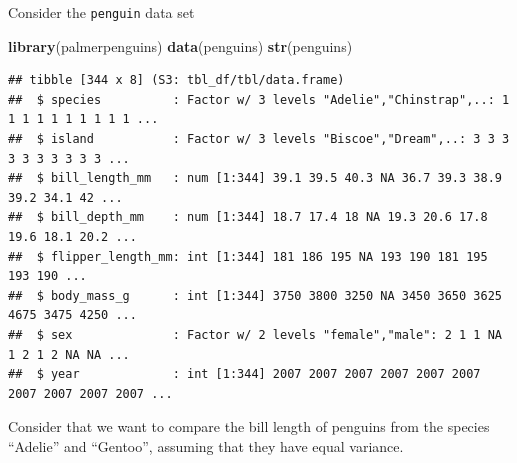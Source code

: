\documentclass[
]{article}
\newenvironment{Shaded}{\begin{snugshade}}{\end{snugshade}}
\newcommand{\AttributeTok}[1]{\textcolor[rgb]{0.13,0.29,0.53}{#1}}
\newcommand{\ConstantTok}[1]{\textcolor[rgb]{0.56,0.35,0.01}{#1}}
\newcommand{\FunctionTok}[1]{\textcolor[rgb]{0.13,0.29,0.53}{\textbf{#1}}}
\newcommand{\NormalTok}[1]{#1}
\newcommand{\OtherTok}[1]{\textcolor[rgb]{0.56,0.35,0.01}{#1}}
\newcommand{\SpecialCharTok}[1]{\textcolor[rgb]{0.81,0.36,0.00}{\textbf{#1}}}
\newcommand{\StringTok}[1]{\textcolor[rgb]{0.31,0.60,0.02}{#1}}
\begin{document}
Consider the \texttt{penguin} data set

\begin{Shaded}
\begin{Highlighting}[]
\FunctionTok{library}\NormalTok{(palmerpenguins)}
\FunctionTok{data}\NormalTok{(penguins)}
\FunctionTok{str}\NormalTok{(penguins)}
\end{Highlighting}
\end{Shaded}

\begin{verbatim}
## tibble [344 x 8] (S3: tbl_df/tbl/data.frame)
##  $ species          : Factor w/ 3 levels "Adelie","Chinstrap",..: 1 1 1 1 1 1 1 1 1 1 ...
##  $ island           : Factor w/ 3 levels "Biscoe","Dream",..: 3 3 3 3 3 3 3 3 3 3 ...
##  $ bill_length_mm   : num [1:344] 39.1 39.5 40.3 NA 36.7 39.3 38.9 39.2 34.1 42 ...
##  $ bill_depth_mm    : num [1:344] 18.7 17.4 18 NA 19.3 20.6 17.8 19.6 18.1 20.2 ...
##  $ flipper_length_mm: int [1:344] 181 186 195 NA 193 190 181 195 193 190 ...
##  $ body_mass_g      : int [1:344] 3750 3800 3250 NA 3450 3650 3625 4675 3475 4250 ...
##  $ sex              : Factor w/ 2 levels "female","male": 2 1 1 NA 1 2 1 2 NA NA ...
##  $ year             : int [1:344] 2007 2007 2007 2007 2007 2007 2007 2007 2007 2007 ...
\end{verbatim}

Consider that we want to compare the bill length of penguins from the
species ``Adelie'' and ``Gentoo'', assuming that they have equal
variance.

\begin{Shaded}
\end{Shaded}
\end{document}
